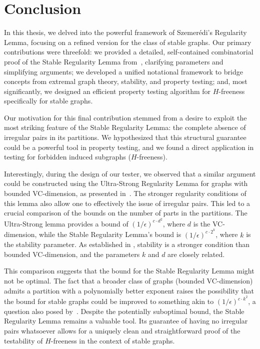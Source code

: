 \section{Conclusion} \label{sec:conclusion}
    In this thesis, we delved into the powerful framework of Szemerédi's Regularity Lemma,
    focusing on a refined version for the class of stable graphs.
    Our primary contributions were threefold: we provided a detailed, self-contained combinatorial proof of the Stable
    Regularity Lemma from~\cite{regularity_lemmas_for_stable_graphs}, clarifying parameters and simplifying arguments;
    we developed a unified notational framework to bridge concepts from extremal graph theory, stability,
    and property testing; and, most significantly, we designed an efficient property testing algorithm for
    $H$-freeness specifically for stable graphs.

    Our motivation for this final contribution stemmed from a desire to exploit the most striking feature of the Stable
    Regularity Lemma: the complete absence of irregular pairs in its partitions.
    We hypothesized that this structural guarantee could be a powerful tool in property testing, and we found a
    direct application in testing for forbidden induced subgraphs ($H$-freeness).

    Interestingly, during the design of our tester, we observed that a similar argument could be constructed using the
    Ultra-Strong Regularity Lemma for graphs with bounded VC-dimension, as presented
    in~\cite{regularity_partitions_and_the_topology_of_graphons}.
    The stronger regularity conditions of this lemma also allow one to effectively  the issue of irregular
    pairs.
    This led to a crucial comparison of the bounds on the number of parts in the partitions.
    The Ultra-Strong lemma provides a bound of $(1/\epsilon)^{c \cdot d^2}$, where $d$ is the VC-dimension,
    while the Stable Regularity Lemma's bound is $(1/\epsilon)^{c \cdot 2^k}$, where $k$ is the stability parameter.
    As established in , stability is a stronger condition than bounded VC-dimension,
    and the parameters $k$ and $d$ are closely related.

    This comparison suggests that the bound for the Stable Regularity Lemma might not be optimal.
    The fact that a broader class of graphs (bounded VC-dimension) admits a partition with a polynomially better
    exponent raises the possibility that the bound for stable graphs could be improved to something akin to
    $(1/\epsilon)^{c \cdot k^2}$, a question also posed by~\cite{julia_wolf_private_comunication}.
    Despite the potentially suboptimal bound, the Stable Regularity Lemma remains a valuable tool.
    Its guarantee of having no irregular pairs whatsoever allows for a uniquely clean and straightforward
    proof of the testability of $H$-freeness in the context of stable graphs.

